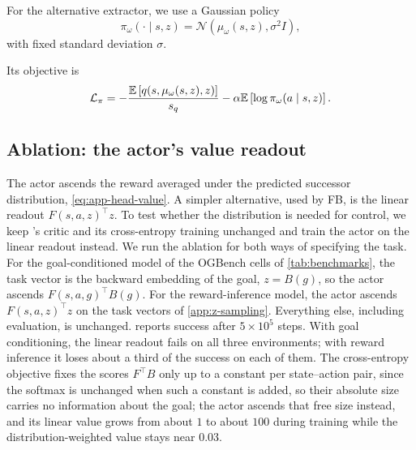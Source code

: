 For the alternative extractor, we use a Gaussian policy
\begin{equation}
    \pi_\omega(\cdot\mid s,z) = \mathcal N \left( \mu_\omega(s,z), \sigma^2 I \right),
\end{equation}
with fixed standard deviation $\sigma$.

Its objective is
\begin{equation}
    \mathcal L_{\pi} = - \frac{ \mathbb{E}\left[ q(s,\mu_\omega(s,z),z) \right] }{ s_q } - \alpha \mathbb{E} \left[ \log \pi_\omega(a\mid s,z) \right]. \label{eq:app-ddpgbc}
\end{equation}


\subsection{Ablation: the actor's value readout}
\label{app:fz-ablation}
The actor ascends the reward averaged under the predicted successor distribution, \eqref{eq:app-head-value}.
A simpler alternative, used by FB, is the linear readout $F(s,a,z)^\top z$.
To test whether the distribution is needed for control, we keep \name{}'s critic and its cross-entropy training unchanged and train the actor on the linear readout instead.
We run the ablation for both ways of specifying the task. For the goal-conditioned model of the OGBench cells of \cref{tab:benchmarks}, the task vector is the backward embedding of the goal, $z=B(g)$, so the actor ascends $F(s,a,g)^\top B(g)$. For the reward-inference model, the actor ascends $F(s,a,z)^\top z$ on the task vectors of \cref{app:z-sampling}. Everything else, including evaluation, is unchanged.
 reports success after $5\times10^5$ steps.
With goal conditioning, the linear readout fails on all three environments; with reward inference it loses about a third of the success on each of them.
The cross-entropy objective fixes the scores $F^\top B$ only up to a constant per state--action pair, since the softmax is unchanged when such a constant is added, so their absolute size carries no information about the goal; the actor ascends that free size instead, and its linear value grows from about $1$ to about $100$ during training while the distribution-weighted value stays near $0.03$.

